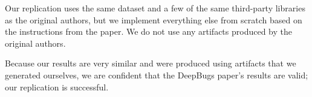 \begin{table}[]
\caption{Our replication uses the same dataset and a few of the same third-party libraries as the original authors, but we implement everything else from scratch based on the instructions from the paper. We do not use any artifacts produced by the original authors.}
\label{tab:replication-discussion}
\end{table}

Because our results are very similar and were produced using artifacts that we generated ourselves, we are confident that the DeepBugs paper's results are valid; our replication is successful.